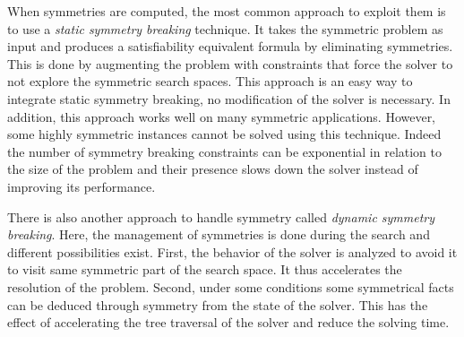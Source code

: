 When symmetries are computed, the most common approach to exploit them is to use a \emph{static symmetry breaking} technique.
It takes the symmetric problem as input and produces a satisfiability equivalent formula by eliminating symmetries. This is done by augmenting the problem with constraints that force the solver to not explore the symmetric search  spaces.
This approach is an easy way to integrate static symmetry breaking, no modification of the solver is necessary.
In addition, this approach works well on many symmetric applications.
However, some highly symmetric instances cannot be solved using this technique. 
Indeed the number of symmetry breaking constraints can be exponential in relation to the size of the problem
 and their presence slows down the solver instead of improving its performance.

There is also another approach to handle symmetry called \emph{dynamic symmetry breaking}. Here, the management of
symmetries is done during the search and different possibilities exist. 
First, the behavior of the solver is analyzed to avoid 
it to visit same symmetric part of the search space. It thus accelerates the resolution of the problem.
Second, under some conditions some symmetrical facts can be deduced through symmetry from the
state of the solver. This has the effect of accelerating the tree traversal of the solver and reduce the solving time.

%
%
%
%
%
%


